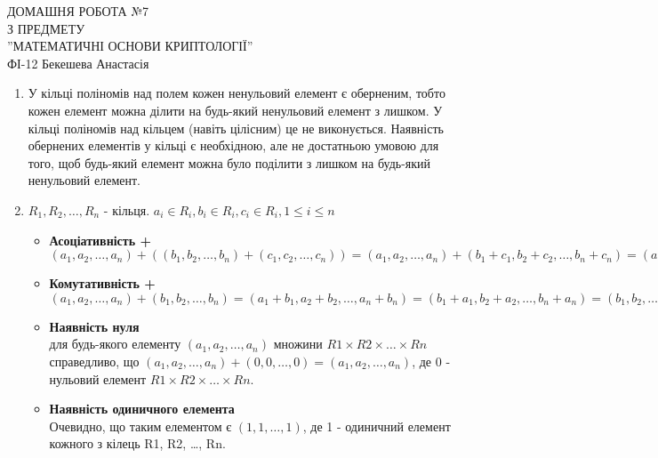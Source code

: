 \documentclass[a4paper,12pt]{article}
\begin{document}
	\begin{justify}
		\thispagestyle{empty}\setlength{\parindent}{0pt}
 		\vspace*{\fill}
  		\begin{center}
  			\noindent\makebox[\linewidth]{\rule{\paperwidth}{0.4pt}}
   			\LARGE{\bigbreak ДОМАШНЯ РОБОТА №7\\З ПРЕДМЕТУ\\''МАТЕМАТИЧНІ ОСНОВИ КРИПТОЛОГІЇ''\\\bigbreak} 
   			ФІ-12 Бекешева Анастасія 
   			\noindent\makebox[\linewidth]{\rule{\paperwidth}{0.4pt}}
  		\end{center}
 		\vspace*{\fill}\newpage
 		\begin{enumerate}
 			\item У кільці поліномів над полем кожен ненульовий елемент є оберненим, тобто кожен елемент можна ділити на будь-який ненульовий елемент з лишком. У кільці поліномів над кільцем (навіть цілісним) це не виконується. Наявність обернених елементів у кільці є необхідною, але не достатньою умовою для того, щоб будь-який елемент можна було поділити з лишком на будь-який ненульовий елемент.
 			\item $R_1,R_2,\dots,R_n$ - кільця. $a_i\in R_i,b_i\in R_i,c_i\in R_i,1\leq i\leq n$ 
 			\begin{itemize}
 				\item \textbf{Асоціативність +}\\$(a_1, a_2, \dots , a_n) + ((b_1, b_2, \dots , b_n) + (c_1, c_2, \dots , c_n)) = (a_1, a_2, \dots , a_n) + (b_1 + c_1, b_2 + c_2, \dots , b_n + c_n) = (a_1 + b_1 + c_1, a_2 + b_2 + c_2, \dots , a_n + b_n + c_n) = ((a_1 + b_1, a_2 + b_2, \dots , a_n + b_n) + (c_1, c_2, \dots , c_n)) = ((a_1, a_2, \dots , a_n) + (b_1, b_2, \dots , b_n)) + (c_1, c_2, \dots , c_n).$
 				\item \textbf{Комутативність +}\\$(a_1, a_2, \dots , a_n) + (b_1, b_2, \dots , b_n) = (a_1 + b_1, a_2 + b_2, \dots , a_n + b_n) = (b_1 + a_1, b_2 + a_2, \dots , b_n + a_n) = (b_1, b_2, \dots , b_n) + (a_1, a_2, \dots , a_n).$
 				\item \textbf{Наявність нуля}\\ для будь-якого елементу $(a_1, a_2, \dots , a_n)$ множини $R1 \times R2 \times \dots  \times Rn$ справедливо, що $(a_1, a_2, \dots , a_n) + (0, 0, \dots , 0) = (a_1, a_2, \dots , a_n)$, де 0 - нульовий елемент $R1 \times R2 \times \dots  \times Rn$.
 				\item \textbf{Наявність одиничного елемента}\\ Очевидно, що таким елементом є $(1,1,\dots ,1)$, де 1 - одиничний елемент кожного з кілець R1, R2, \dots , Rn.

\end{itemize}
\end{enumerate}
\end{justify}
\end{document}
